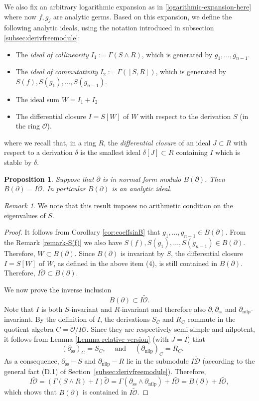 \documentclass[10pt,twoside,reqno]{amsart}
\newtheorem{proposition}[thm]{Proposition}
\theoremstyle{remark}
\theoremstyle{remark}
\newtheorem{remark}[thm]{Remark}
\newcommand{\OO}{\mathcal{O}}
\newcommand{\tmem}[1]{{\em #1\/}}
\newcommand{\tmop}[1]{{\operatorname{#1}}}
\newcommand{\tO}{\widetilde{\mathcal{O}}}
\newcommand{\cD}{\mathcal{D}}
\newcommand{\tcD}{\widetilde{\cD}}
\begin{document}
We also fix an arbitrary logarithmic expansion as in \eqref{logarithmic-expansion-here} where now $f,g_j$ are analytic germs. Based on this expansion, we define the following analytic ideals, using the notation introduced in subsection \ref{subsec:derivfreemodule}:
\begin{itemize}\setlength{\itemsep}{0.4em}
  \item[(1)]The {\tmem{ideal of collinearity}} $I_1 := \Gamma (S \wedge R)$, which is generated
  by $g_1, \ldots, g_{n - 1}$.
  \item[(2)] The {\tmem{ideal of commutativity}} $I_2 := \Gamma ([S, R])$, which is generated
  by $S (f), S (g_1), \ldots, S (g_{n - 1}) .$
  \item[(3)] The ideal sum $W = I_1 + I_2$
 \item[(4)] The differential closure $I = S [W]$ of $W$ with respect to the derivation $S$ (in the ring $\OO$). 
\end{itemize}
where we recall that, in a ring $R$, the {\em differential closure} of an ideal $J\subset R$ with respect to a derivation $\delta$ is the smallest ideal $\delta[J]\subset R$ containing $I$ which is stable by $\delta$. 
 \begin{proposition}\label{prop-analyticity-Bruno-ideal}
  Suppose that $\partial$ is in normal form modulo $B(\partial)$. Then $B
  (\partial) = I \tO$. In particular $B (\partial)$ is an analytic ideal.
\end{proposition}
\noindent \begin{remark}
We note that this result imposes no arithmetic condition on the eigenvalues of \(S\).
\end{remark}
\begin{proof}
  It follows from Corollary \ref{cor:coeffsinB} that $g_1, \ldots, g_{n -
  1} \in B (\partial)$. From the Remark \ref{remark-S(f)} we also have $S
  (f), S (g_1), \ldots, S (g_{n - 1}) \in B (\partial)$. Therefore, $W \subset
  B (\partial)$. Since $B (\partial)$ is invariant by $S$, the differential
  closure $I = S [W]$ of $W$, as defined in the above item (4),  is still contained in $B (\partial)$. Therefore,
  $I \tO \subset B (\partial)$.
  
  We now prove the inverse inclusion
  \[ B (\partial) \subset I \tO . \]
  Note that $I$ is both $S$-invariant and $R$-invariant and therefore also
  $\partial, \partial_{\tmop{ss}}$ and $\partial_{\tmop{nilp}}$-invariant. By
  the definition of $I$, the derivations $S_C$ and $R_C$ commute in the
  quotient algebra $C = \tO / I \tO$. Since they are respectively semi-simple
  and nilpotent, it follows from Lemma \ref{Lemma-relative-version} (with $J=I$) that \
  \[ (\partial_{\tmop{ss}})_C = S_C, \quad \tmop{and} \quad
     (\partial_{\tmop{nilp}})_C = R_C. \qquad \]
  As a consequence, $\partial_{\tmop{ss}} - S$ and $\partial_{\tmop{nilp}} -
  R$ lie in the submodule $I \tcD$ (according to the general fact (D.1) of Section~\ref{subsec:derivfreemodule}). Therefore,
   \[ I \tO = (\Gamma (S \wedge R) + I)  \tO = \Gamma (\partial_{\tmop{ss}}
     \wedge \partial_{\tmop{nilp}}) + I \tO = B (\partial) + I \tO , \]
  which shows that $B (\partial)$ is contained in $I \tO$. 
\end{proof}
\end{document}
